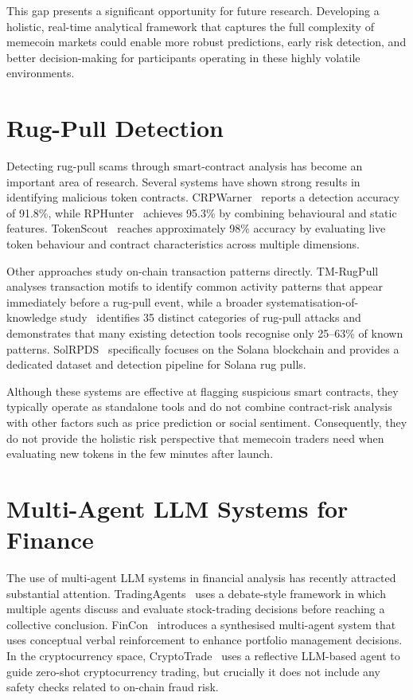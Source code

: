 \documentclass[12pt,a4paper,oneside,openany]{book}
\begin{document}
This gap presents a significant opportunity for future research. Developing a holistic, real-time analytical framework that captures the full complexity of memecoin markets could enable more robust predictions, early risk detection, and better decision-making for participants operating in these highly volatile environments.

\section{Rug-Pull Detection}
Detecting rug-pull scams through smart-contract analysis has become an important area of research. Several systems have shown strong results in identifying malicious token contracts. CRPWarner~\cite{ref5} reports a detection accuracy of 91.8\%, while RPHunter~\cite{ref12} achieves 95.3\% by combining behavioural and static features. TokenScout~\cite{ref13} reaches approximately 98\% accuracy by evaluating live token behaviour and contract characteristics across multiple dimensions.

Other approaches study on-chain transaction patterns directly. TM-RugPull~\cite{ref36} analyses transaction motifs to identify common activity patterns that appear immediately before a rug-pull event, while a broader systematisation-of-knowledge study~\cite{ref20} identifies 35 distinct categories of rug-pull attacks and demonstrates that many existing detection tools recognise only 25--63\% of known patterns. SolRPDS~\cite{ref3} specifically focuses on the Solana blockchain and provides a dedicated dataset and detection pipeline for Solana rug pulls.

Although these systems are effective at flagging suspicious smart contracts, they typically operate as standalone tools and do not combine contract-risk analysis with other factors such as price prediction or social sentiment. Consequently, they do not provide the holistic risk perspective that memecoin traders need when evaluating new tokens in the few minutes after launch.

\section{Multi-Agent LLM Systems for Finance}
The use of multi-agent LLM systems in financial analysis has recently attracted substantial attention. TradingAgents~\cite{ref23} uses a debate-style framework in which multiple agents discuss and evaluate stock-trading decisions before reaching a collective conclusion. FinCon~\cite{ref24} introduces a synthesised multi-agent system that uses conceptual verbal reinforcement to enhance portfolio management decisions. In the cryptocurrency space, CryptoTrade~\cite{ref25} uses a reflective LLM-based agent to guide zero-shot cryptocurrency trading, but crucially it does not include any safety checks related to on-chain fraud risk.
\end{document}
